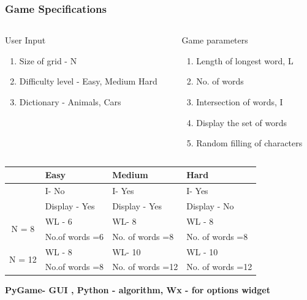 \documentclass{beamer}
\begin{document}
\begin{frame}\frametitle{Game Specifications}
\begin{columns}[c]
\begin{column}{5cm}
\begin{block}{User Input }
\begin{enumerate}
\item Size of grid - N
\item Difficulty level - Easy, Medium Hard
\item Dictionary - Animals, Cars
\end{enumerate}
\end{block}
\end{column}
\pause
\begin{column}{5cm}
\begin{block}{Game parameters}
\begin{enumerate}
\item Length of longest word, L
\item No. of words
\item Intersection of words, I
\item Display the set of words  
\item Random filling of characters
\end{enumerate}
\end{block}
\end{column}
\end{columns}
\pause
\centering
\label{tablewc}
\resizebox{\columnwidth}{!}
{

\begin{tabular}{|c|l | l | l |}
\hline
 & Easy & Medium & Hard \\
\hline
  & I- No & I- Yes & I- Yes\\
& Display - Yes & Display - Yes & Display - No  \\ \hline
\multirow{2}{*}{N = 8}  & WL - 6 &  WL- 8 & WL - 8\\
& No.of words =6 & No. of words =8 & No. of words =8\\
\hline
\multirow{2}{*}{N = 12}  & WL - 8 &  WL- 10 & WL - 10\\
& No.of words =8 & No. of words =12 & No. of words =12\\
\hline
\end{tabular}
}
\vfill
\textbf{PyGame- GUI , Python - algorithm, Wx - for options widget}
\end{frame}
\end{document}
